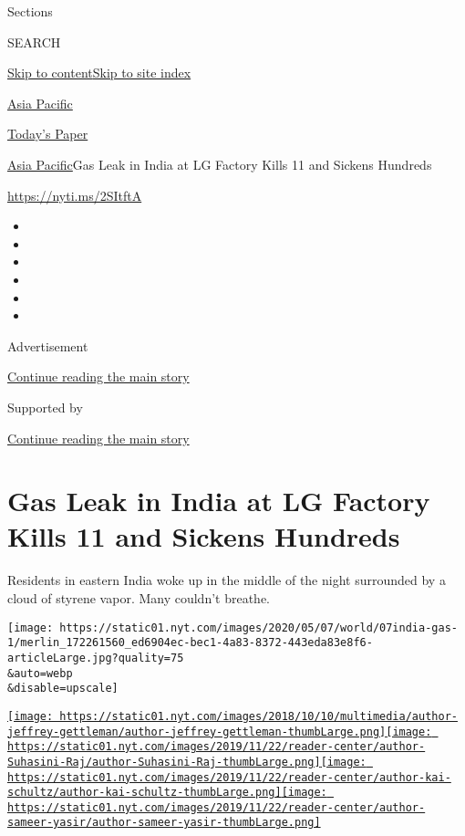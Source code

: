 Sections

SEARCH

\protect\hyperlink{site-content}{Skip to
content}\protect\hyperlink{site-index}{Skip to site index}

\href{https://www.nytimes.com/section/world/asia}{Asia Pacific}

\href{https://myaccount.nytimes.com/auth/login?response_type=cookie\&client_id=vi}{}

\href{https://www.nytimes.com/section/todayspaper}{Today's Paper}

\href{/section/world/asia}{Asia Pacific}\textbar{}Gas Leak in India at
LG Factory Kills 11 and Sickens Hundreds

\url{https://nyti.ms/2SItftA}

\begin{itemize}
\item
\item
\item
\item
\item
\item
\end{itemize}

Advertisement

\protect\hyperlink{after-top}{Continue reading the main story}

Supported by

\protect\hyperlink{after-sponsor}{Continue reading the main story}

\hypertarget{gas-leak-in-india-at-lg-factory-kills-11-and-sickens-hundreds}{%
\section{Gas Leak in India at LG Factory Kills 11 and Sickens
Hundreds}\label{gas-leak-in-india-at-lg-factory-kills-11-and-sickens-hundreds}}

Residents in eastern India woke up in the middle of the night surrounded
by a cloud of styrene vapor. Many couldn't breathe.

\texttt{[image: https://static01.nyt.com/images/2020/05/07/world/07india-gas-1/merlin\_172261560\_ed6904ec-bec1-4a83-8372-443eda83e8f6-articleLarge.jpg?quality=75\\\&auto=webp\\\&disable=upscale]}

\href{https://www.nytimes.com/by/jeffrey-gettleman}{\texttt{[image: https://static01.nyt.com/images/2018/10/10/multimedia/author-jeffrey-gettleman/author-jeffrey-gettleman-thumbLarge.png]}}\href{https://www.nytimes.com/by/suhasini-raj}{\texttt{[image: https://static01.nyt.com/images/2019/11/22/reader-center/author-Suhasini-Raj/author-Suhasini-Raj-thumbLarge.png]}}\href{https://www.nytimes.com/by/kai-schultz}{\texttt{[image: https://static01.nyt.com/images/2019/11/22/reader-center/author-kai-schultz/author-kai-schultz-thumbLarge.png]}}\href{https://www.nytimes.com/by/sameer-yasir}{\texttt{[image: https://static01.nyt.com/images/2019/11/22/reader-center/author-sameer-yasir/author-sameer-yasir-thumbLarge.png]}}

